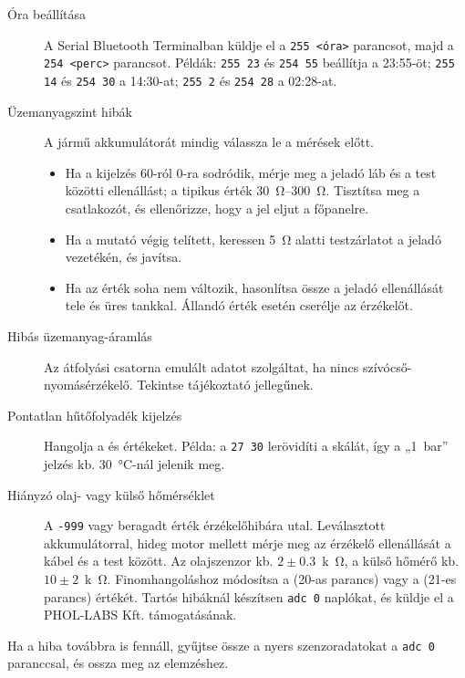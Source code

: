 \begin{description}
    \item[Óra beállítása] A Serial Bluetooth Terminalban küldje el a \verb|255 <óra>| parancsot, majd a \verb|254 <perc>| parancsot. Példák: \verb|255 23| és \verb|254 55| beállítja a 23:55-öt; \verb|255 14| és \verb|254 30| a 14:30-at; \verb|255 2| és \verb|254 28| a 02:28-at.
    \item[Üzemanyagszint hibák] A jármű akkumulátorát mindig válassza le a mérések előtt.\begin{itemize}
        \item Ha a kijelzés 60-ról 0-ra sodródik, mérje meg a jeladó láb és a test közötti ellenállást; a tipikus érték \SIrange{30}{300}{\ohm}. Tisztítsa meg a csatlakozót, és ellenőrizze, hogy a jel eljut a főpanelre.
        \item Ha a mutató végig telített, keressen \SI{5}{\ohm} alatti testzárlatot a jeladó vezetékén, és javítsa.
        \item Ha az érték soha nem változik, hasonlítsa össze a jeladó ellenállását tele és üres tankkal. Állandó érték esetén cserélje az érzékelőt.
    \end{itemize}
    \item[Hibás üzemanyag-áramlás] Az átfolyási csatorna emulált adatot szolgáltat, ha nincs szívócső-nyomásérzékelő. Tekintse tájékoztató jellegűnek.
    \item[Pontatlan hűtőfolyadék kijelzés] Hangolja a  és  értékeket. Példa: a \verb|27 30| lerövidíti a skálát, így a „1~bar” jelzés kb. \SI{30}{\celsius}-nál jelenik meg.
    \item[Hiányzó olaj- vagy külső hőmérséklet] A \texttt{-999} vagy beragadt érték érzékelőhibára utal. Leválasztott akkumulátorral, hideg motor mellett mérje meg az érzékelő ellenállását a kábel és a test között. Az olajszenzor kb. \ensuremath{2\pm0.3}~\si{k\ohm}, a külső hőmérő kb. \ensuremath{10\pm2}~\si{k\ohm}. Finomhangoláshoz módosítsa a  (20-as parancs) vagy a  (21-es parancs) értékét. Tartós hibáknál készítsen \verb|adc 0| naplókat, és küldje el a PHOL-LABS Kft. támogatásának.
\end{description}

Ha a hiba továbbra is fennáll, gyűjtse össze a nyers szenzoradatokat a \verb|adc 0| paranccsal, és ossza meg az elemzéshez.
